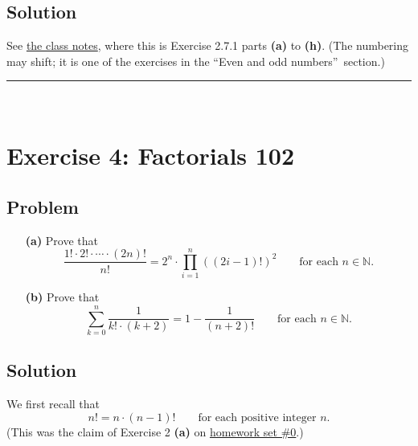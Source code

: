 \documentclass[paper=a4, fontsize=12pt]{scrartcl}%
\let\sumnonlimits\sum
\let\prodnonlimits\prod
\renewcommand{\sum}{\sumnonlimits\limits}
\renewcommand{\prod}{\prodnonlimits\limits}
\theoremstyle{plainsl}
\theoremstyle{definition}
\theoremstyle{remark}
\begin{document}
\subsection{Solution}

See \href{http://www-users.math.umn.edu/~dgrinber/19s/notes.pdf}{the class
notes}, where this is Exercise 2.7.1 parts \textbf{(a)} to \textbf{(h)}. (The
numbering may shift; it is one of the exercises in the \textquotedblleft Even
and odd numbers\textquotedblright\ section.)

\rule{\linewidth}{0.3pt} \\[0.4cm]

\section{Exercise 4: Factorials 102}

\subsection{Problem}

\begin{enumerate}
\item[\textbf{(a)}] Prove that
\[
\dfrac{1! \cdot2! \cdot\cdots\cdot\left(  2n \right)  !}{n!} = 2^{n}
\cdot\prod_{i=1}^{n} \left(  \left(  2i-1 \right)  ! \right)  ^{2}
\qquad\text{for each } n \in\mathbb{N} .
\]


\item[\textbf{(b)}] Prove that
\[
\sum_{k=0}^{n} \dfrac{1}{k! \cdot\left(  k+2 \right)  } = 1 - \dfrac
{1}{\left(  n+2 \right)  !} \qquad\text{for each } n \in\mathbb{N} .
\]

\end{enumerate}

\subsection{Solution}

We first recall that%
\begin{equation}
n!=n\cdot\left(  n-1\right)  !\qquad\text{for each positive integer }n.
\label{sol.factorials.102.fac-rec}%
\end{equation}
(This was the claim of Exercise 2 \textbf{(a)} on
\href{http://www-users.math.umn.edu/~dgrinber/19s/hw0s.pdf}{homework set \#0}.)
\end{document}

